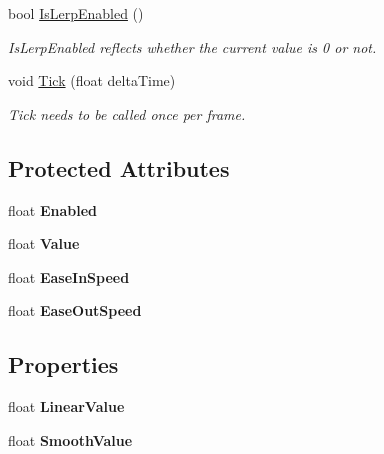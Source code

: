 \begin{DoxyCompactItemize}
bool \mbox{\hyperlink{class_timed_lerp_abfe1bf353d18a0fed4c9c83a665aa2fd}{Is\+Lerp\+Enabled}} ()
\begin{DoxyCompactList}\small\item\em Is\+Lerp\+Enabled reflects whether the current value is 0 or not. \end{DoxyCompactList}\item 
\mbox{\label{class_timed_lerp_a16a1d4a28fb9a621808f94e877e4e518}} 
void \mbox{\hyperlink{class_timed_lerp_a16a1d4a28fb9a621808f94e877e4e518}{Tick}} (float delta\+Time)
\begin{DoxyCompactList}\small\item\em Tick needs to be called once per frame. \end{DoxyCompactList}\end{DoxyCompactItemize}
\subsection*{Protected Attributes}
\begin{DoxyCompactItemize}
\item 
\mbox{\label{class_timed_lerp_a38bd18cd8de9a62364e47bee6eb4771b}} 
float {\bfseries Enabled}
\item 
\mbox{\label{class_timed_lerp_a3986137427e1e7bd66bb783fb2d86b10}} 
float {\bfseries Value}
\item 
\mbox{\label{class_timed_lerp_aeed2ea010b62bd529013dc9b9bcac0a7}} 
float {\bfseries Ease\+In\+Speed}
\item 
\mbox{\label{class_timed_lerp_a2a08436125e40b0c670c5fd90c7f6db9}} 
float {\bfseries Ease\+Out\+Speed}
\end{DoxyCompactItemize}
\subsection*{Properties}
\begin{DoxyCompactItemize}
\item 
\mbox{\label{class_timed_lerp_a299ba73016b0b467b4e05f663da50c6e}} 
float {\bfseries Linear\+Value}
\item 
\mbox{\label{class_timed_lerp_aca0279f3da2195aa1c275a42e4694301}} 
float {\bfseries Smooth\+Value}
\end{DoxyCompactItemize}


